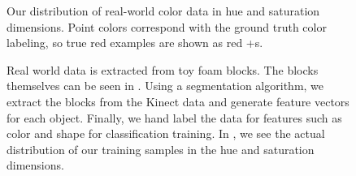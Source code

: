 \documentclass[11pt]{article}
\begin{document}
\begin{figure}
\centering
\caption{Our distribution of real-world color data in hue and saturation
    dimensions. Point colors correspond with the ground truth color labeling,
    so true red examples are shown as red +s.}
\label{fig:colordata}
\end{figure}

\begin{figure}[h!]
\centering
{}
\caption{Real world data is extracted from toy foam blocks. The blocks
    themselves can be seen in . Using a segmentation
    algorithm, we extract the blocks from the Kinect data 
    and generate feature vectors for each object.
    Finally, we hand label the data for features such as color and shape for
    classification training. In , we see the actual
    distribution of our training samples in the hue and saturation
    dimensions.}
\label{fig:objects}
\end{figure}
\end{document}
